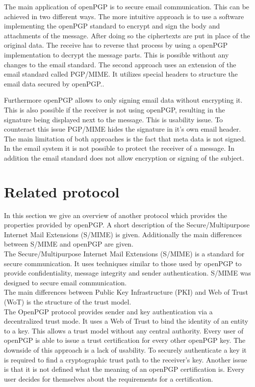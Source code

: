 The main application of openPGP is to secure email communication. This can be achieved in two different ways. The more intuitive approach is to use a software implementing the openPGP standard to encrypt and sign the body and attachments of the message. After doing so the ciphertexts are put in place of the original data. The receive has to reverse that process by using a openPGP implementation to decrypt the message parts. This is possible without any changes to the email standard. The second approach uses an extension of the email standard called PGP/MIME. It utilizes special headers to structure the email data secured by openPGP..

Furthermore openPGP allows to only signing email data without encrypting it. This is also possible if the receiver is not using openPGP, resulting in the signature being displayed next to the message. This is usability issue. To counteract this issue PGP/MIME hides the signature in it's own email header. \\


The main limitation of both approaches is the fact that meta data is not signed. In the email system it is not possible to protect the receiver of a message. In addition the email standard does not allow encryption or signing of the subject.

\section{Related protocol} \label{section:openpgp:smime}

In this section we give an overview of another protocol which provides the properties provided by openPGP. A short description of the Secure/Multipurpose Internet Mail Extensions (S/MIME) is given. Additionally the main differences between S/MIME and openPGP are given. \\

The Secure/Multipurpose Internet Mail Extensions (S/MIME) is a standard for secure communication. It uses techniques similar to those used by openPGP to provide confidentiality, message integrity and sender authentication. S/MIME was designed to secure email communication.  \\

The main differences between Public Key Infrastructure (PKI) and Web of Trust (WoT) is the structure of the trust model.  \\

The OpenPGP protocol provides sender and key authentication via a decentralized trust mode. It uses a Web of Trust to bind the identity of an entity to a key. This allows a trust model without any central authority. Every user of openPGP is able to issue a trust certification for every other openPGP key. The downside of this approach is a lack of usability. To securely authenticate a key it is required to find a cryptographic trust path to the receiver's key. Another issue is that it is not defined what the meaning of an openPGP certification is. Every user decides for themselves about the requirements for a certification. \\

